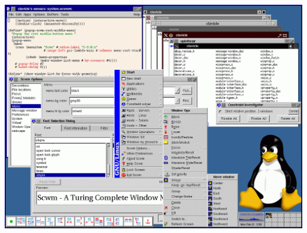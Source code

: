 \documentclass{lug}
\begin{document}
\begin{frame}
\begin{columns}
\begin{column}{0.3\textwidth}
            \vspace*{4pt}
            \includegraphics[width=\textwidth]{graphics/scwm} \par
        \end{column}
    \end{columns}
\end{frame}
\end{document}
